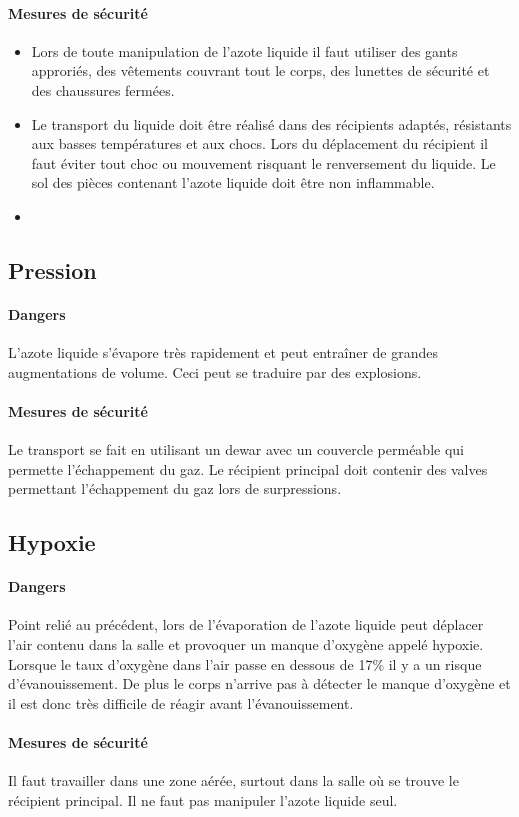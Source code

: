 \paragraph{Mesures de sécurité}

\begin{itemize}
  \item Lors de toute manipulation de l'azote liquide il faut utiliser des gants approriés, des vêtements couvrant tout le corps, des lunettes de sécurité et des chaussures fermées.
  \item Le transport du liquide doit être réalisé dans des récipients adaptés, résistants aux basses températures et aux chocs. Lors du déplacement du récipient il faut éviter tout choc ou mouvement risquant le renversement du liquide. Le sol des pièces contenant l'azote liquide doit être non inflammable.
  \item 
\end{itemize}

\subsection{Pression}

\paragraph{Dangers}

L'azote liquide s'évapore très rapidement et peut entraîner de grandes augmentations de volume. Ceci peut se traduire par des explosions.
\paragraph{Mesures de sécurité}

Le transport se fait en utilisant un dewar avec un couvercle perméable qui permette l'échappement du gaz. Le récipient principal doit contenir des valves permettant l'échappement du gaz lors de surpressions.

\subsection{Hypoxie}

\paragraph{Dangers}

Point relié au précédent, lors de l'évaporation de l'azote liquide peut déplacer l'air contenu dans la salle et provoquer un manque d'oxygène appelé hypoxie. Lorsque le taux d'oxygène dans l'air passe en dessous de 17\% il y a un risque d'évanouissement. De plus le corps n'arrive pas à détecter le manque d'oxygène et il est donc très difficile de réagir avant l'évanouissement.
\paragraph{Mesures de sécurité}

Il faut travailler dans une zone aérée, surtout dans la salle où se trouve le récipient principal. Il ne faut pas manipuler l'azote liquide seul.




